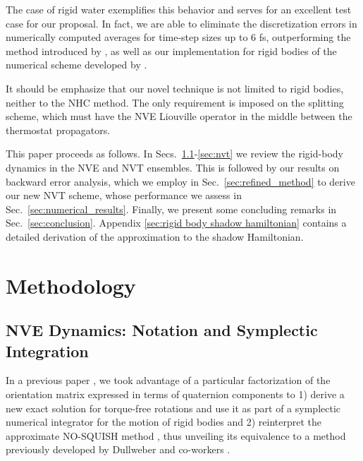 \documentclass[
journal=jctcce,
layout=twocolumn
]{achemso}
\begin{document}
The case of rigid water exemplifies this behavior and serves for an excellent test case for our proposal. 
In fact, we are able to eliminate the discretization errors in numerically computed averages for time-step sizes up to 6 fs, outperforming the method introduced by \citeauthor{Kamberaj_2005} \cite{Kamberaj_2005}, as well as our implementation for rigid bodies of the numerical scheme developed by \citeauthor{Martyna_1996} \cite{Martyna_1996}.

It should be emphasize that our novel technique is not limited to rigid bodies, neither to the NHC method. 
The only requirement is imposed on the splitting scheme, which must have the NVE Liouville operator in the middle between the thermostat propagators.
 
This paper proceeds as follows.
In Secs.~\ref{sec:nve}-\ref{sec:nvt} we review the rigid-body dynamics in the NVE and NVT ensembles.
This is followed by our results on backward error analysis, which we employ in Sec.~\ref{sec:refined_method} to derive our new NVT scheme, whose performance we assess in Sec.~\ref{sec:numerical_results}.
Finally, we present some concluding remarks in Sec.~\ref{sec:conclusion}. Appendix \ref{sec:rigid body shadow hamiltonian} contains a detailed derivation of the approximation to the shadow Hamiltonian.

\section{Methodology}
\label{sec:methodology}

\subsection{NVE Dynamics: Notation and Symplectic Integration}
\label{sec:nve}
In a previous paper \cite{Silveira_2017}, we took advantage of a particular factorization of the orientation matrix expressed in terms of quaternion components to
1) derive a new exact solution for torque-free rotations and use it as part of a symplectic numerical integrator for the motion of rigid bodies and
2) reinterpret the approximate NO-SQUISH method \cite{Miller_2002}, thus unveiling its equivalence to a method previously developed by Dullweber and co-workers \cite{Dullweber_1997}.
\end{document}
